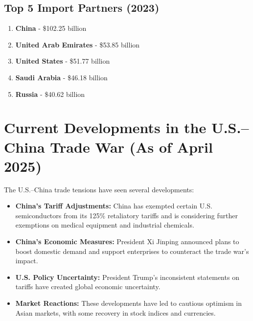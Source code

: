\documentclass[12pt]{article}
\begin{document}
	\subsection{Top 5 Import Partners (2023)}
	
	\begin{enumerate}[label=\arabic*.]
		\item \textbf{China} - \$102.25 billion
		\item \textbf{United Arab Emirates} - \$53.85 billion
		\item \textbf{United States} - \$51.77 billion
		\item \textbf{Saudi Arabia} - \$46.18 billion
		\item \textbf{Russia} - \$40.62 billion
	\end{enumerate}
	
	\section{Current Developments in the U.S.–China Trade War (As of April 2025)}
	
	The U.S.–China trade tensions have seen several developments:
	
	\begin{itemize}
		\item \textbf{China's Tariff Adjustments:} China has exempted certain U.S. semiconductors from its 125\% retaliatory tariffs and is considering further exemptions on medical equipment and industrial chemicals.
		\item \textbf{China's Economic Measures:} President Xi Jinping announced plans to boost domestic demand and support enterprises to counteract the trade war's impact.
		\item \textbf{U.S. Policy Uncertainty:} President Trump's inconsistent statements on tariffs have created global economic uncertainty.
		\item \textbf{Market Reactions:} These developments have led to cautious optimism in Asian markets, with some recovery in stock indices and currencies.
	\end{itemize}
	
\end{document}
